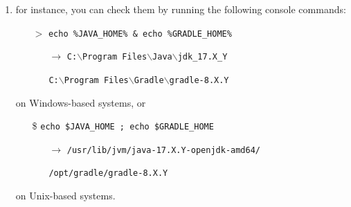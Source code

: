 \documentclass[presentation]{beamer}\mode<presentation>{\usetheme{AMSBolognaFC}}
\begin{document}
\begin{frame}[c,allowframebreaks]
\begin{enumerate}
    \vspace{.5cm}

    \item for instance, you can check them by running the following console commands:
    \begin{itemize}
        \item[$>$] \texttt{echo \alert{\%}JAVA\_HOME\alert{\%} \& echo \alert{\%}GRADLE\_HOME\alert{\%}}
        \begin{itemize}
            \item[$\rightarrow$] \texttt{C:$\backslash$Program Files$\backslash$Java$\backslash$jdk\_17.X\_Y} 
            \item[] \texttt{C:$\backslash$Program Files$\backslash$Gradle$\backslash$gradle-8.X.Y} 
        \end{itemize}
    \end{itemize}
    on Windows-based systems, or
    \begin{itemize}
        \item[\$] \texttt{echo \alert{\$}JAVA\_HOME ; echo \alert{\$}GRADLE\_HOME}
        \begin{itemize}
            \item[$\rightarrow$] \texttt{/usr/lib/jvm/java-17.X.Y-openjdk-amd64/}
            \item[] \texttt{/opt/gradle/gradle-8.X.Y}
        \end{itemize}
    \end{itemize}
    on Unix-based systems.

   \framebreak


\end{enumerate}
\end{frame}
\end{document}
